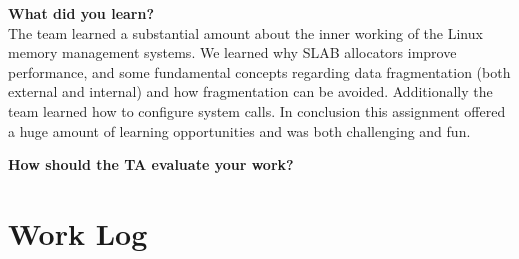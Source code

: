 \documentclass[10pt,onecolumn,draftclsnofoot]{IEEEtran} %
\begin{document}
\begin{singlespace}
   
        \textbf{What did you learn?}\\
        		\normalfont \indent The team learned a substantial amount about the inner working of the Linux memory management systems. We learned why SLAB allocators improve performance, and some fundamental concepts regarding data fragmentation (both external and internal) and how fragmentation can be avoided. Additionally the team learned how to configure system calls. In conclusion this assignment offered a huge amount of learning opportunities and was both challenging and fun. 

        \textbf{How should the TA evaluate your work?}\\
	\section{\bf Work Log}


\newpage


\end{singlespace}
\restoregeometry
\end{document}
